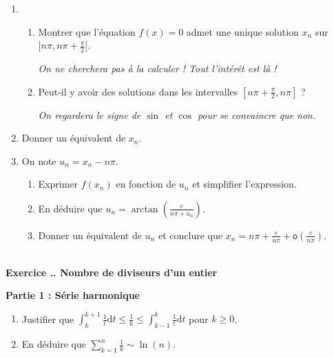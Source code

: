 \documentclass{article}
\newcommand{\di}{\mathrm{d}}
\newcounter{exo}
\newcommand{\exercice}[1][\null]{\textbf{\\ Exercice \thesection.\theexo. #1} \addtocounter{exo}{1}}
\begin{document}
\begin{enumerate}

\item \begin{enumerate}

\item Montrer que l'équation $f(x) = 0$ admet une unique solution $x_n$ sur $]n \pi, n \pi + \frac{\pi}{2}[$.

\emph{On ne cherchera pas à la calculer ! Tout l'intérêt est là !}

\item Peut-il y avoir des solutions dans les intervalles $[n \pi + \frac{\pi}{2}, n \pi]$ ?

\emph{On regardera le signe de $\sin$ et $\cos$ pour se convaincre que non.}

\end{enumerate}

\item Donner un équivalent de $x_n$.

\item On note $u_n = x_n - n \pi$.

\begin{enumerate}

\item Exprimer $f(x_n)$ en fonction de $u_n$ et simplifier l'expression.

\item En déduire que $\displaystyle u_n = \arctan\left(\frac{c}{n\pi + u_n}\right)$.

\item Donner un équivalent de $u_n$ et conclure que $\displaystyle x_n = n \pi + \frac{c}{n \pi} + \mathsf{o}(\frac{c}{n \pi})$.

\end{enumerate}

\end{enumerate}


\exercice[Nombre de diviseurs d'un entier]

{\setlength{\parindent}{0cm}
\textbf{Partie 1 : Série harmonique}}

\begin{enumerate}

\item Justifier que $\displaystyle \int_{k}^{k+1} \frac{1}{t} \di t \le \frac{1}{k} \le \displaystyle \int_{k-1}^{k}  \frac{1}{t} \di t$ pour $k \ge 0$.

\item En déduire que $\displaystyle \sum_{k=1}^n \frac{1}{k} \sim \ln(n)$.

\end{enumerate}
\end{document}
